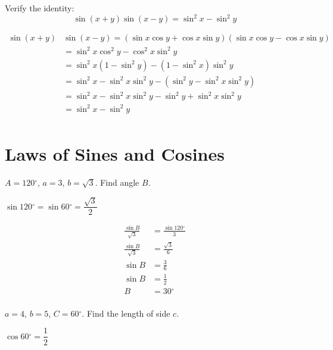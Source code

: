 \documentclass[fleqn,addpoints]{exam}
\newcommand{\degree}{\ensuremath{^\circ}}
\begin{document}
\begin{questions}
\question[7]
Verify the identity:
\[
  \sin(x+y) \sin(x-y) = \sin^2 x - \sin^2 y
\]
\begin{solution}[4 cm]
\begin{align*}
  \sin(x+y) & \sin(x-y) = ( \sin x \cos y + \cos x \sin y)( \sin x \cos y - \cos x \sin y ) \\
  &= \sin^2 x \cos^2 y - \cos^2 x \sin^2 y \\
  &= \sin^2 x (1 - \sin^2 y) - (1 - \sin^2 x) \sin^2 y \\
  &= \sin^2 x - \sin^2 x \sin^2 y - (\sin^2 y - \sin^2 x \sin^2 y ) \\
  &= \sin^2 x - \sin^2 x \sin^2 y - \sin^2 y + \sin^2 x \sin^2 y \\
  &= \sin^2 x - \sin^2 y \\
\end{align*}
\end{solution}


\ifprintanswers
\else
\pagebreak
\fi

\section{Laws of Sines and Cosines}

\question[5]
$A = 120 \degree$, $a = 3$, $b = \sqrt{3}$.  Find angle $B$.
\begin{solution}[4 cm]
$\sin 120 \degree = \sin 60 \degree = \dfrac{\sqrt{3}}{2}$

\begin{align*}
  \frac{\sin B}{\sqrt 3} &= \frac{\sin 120 \degree}{3} \\
  \frac{\sin B}{\sqrt 3} &= \frac{\sqrt{3}}{6} \\
  \sin B &= \frac{3}{6} \\
  \sin B &= \frac{1}{2} \\
  B &= 30 \degree \\  
\end{align*}

\end{solution}

\question[5]
$a = 4$, $b = 5$, $C = 60 \degree$.  Find the length of side $c$. 
\begin{solution}[4 cm]

$\cos 60 \degree = \dfrac{1}{2}$


\end{solution}
\end{questions}
\end{document}
